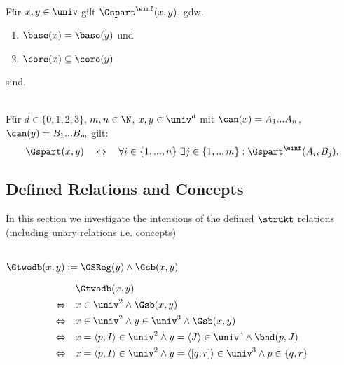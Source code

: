 \begin{dfn}[$\Gspart^\einf$]\ \\ 
    Für $x,y \in \univ$ gilt $\Gspart^\einf(x,y)$, gdw.
    \begin{enumerate}
        \item $\base(x) = \base(y)$ und
        \item $\core(x) \subseteq \core(y)$
    \end{enumerate}
    sind.
\end{dfn}


\begin{dfn}[$\Gspart$]\ \\
    Für $d \in \{0,1,2,3\}$, $m,n \in \N$, $x,y \in \univ^d$ mit $\can(x) = A_1 ... A_n$, $\can(y) = B_1 ... B_m$ gilt:
    $$\Gspart(x,y) \quad \Leftrightarrow \quad \forall i \in \{1, ..., n\}\ \exists j \in \{1, .., m\}: \Gspart^\einf(A_i,B_j). $$
\end{dfn}


\subsection{Defined Relations and Concepts}
In this section we investigate the intensions of the defined $\strukt$ relations (including unary relations i.e. concepts)

\begin{erin}\ \\
    $\Gtwodb(x,y) := \GSReg(y) \wedge \Gsb(x,y)$
\end{erin}

\begin{hyp}
    \begin{align*}
        &\Gtwodb(x,y)\\
        \Leftrightarrow \quad &x \in \univ^2 \land \Gsb(x,y)\\
        \Leftrightarrow \quad &x \in \univ^2 \land y \in \univ^3 \land \Gsb(x,y)\\
        \Leftrightarrow \quad &x = \langle p, I \rangle \in \univ^2 \land y = \langle J \rangle \in \univ^3 \land \bnd(p, J)\\
        \Leftrightarrow \quad &x = \langle p, I \rangle \in \univ^2 \land y = \langle [q, r] \rangle \in \univ^3 \land p \in \{q,r\}
    \end{align*}
\end{hyp}



